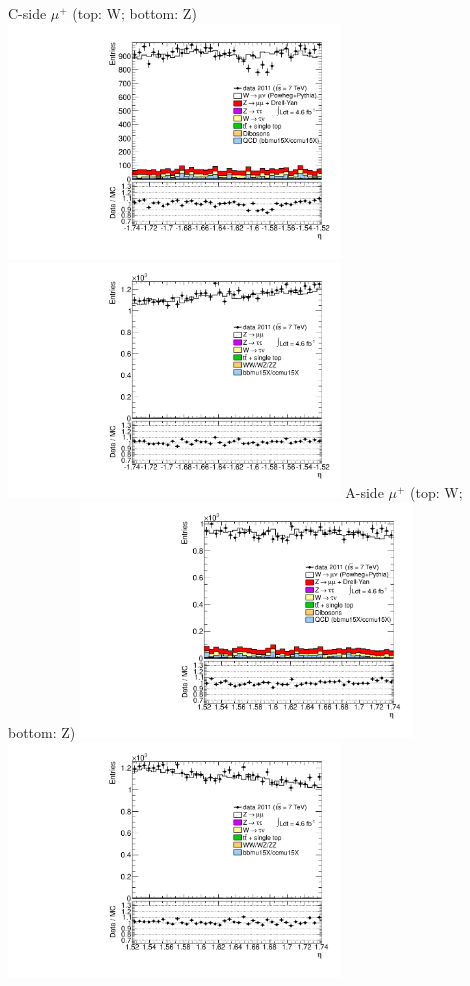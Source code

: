  {
\colb[T]
C-side $\mu^{+}$ (top: W; bottom: Z)
\centering
\includegraphics[width=0.66\textwidth]{dates/20130306/figures/etaphi/WpItoI_8_C_stack_l_eta_POS} \\
\includegraphics[width=0.66\textwidth]{dates/20130306/figures/etaphi/Z_8_C_stack_lP_eta_ALL.pdf}
A-side $\mu^{+}$ (top: W; bottom: Z)
\centering
\includegraphics[width=0.66\textwidth]{dates/20130306/figures/etaphi/WpItoI_8_A_stack_l_eta_POS} \\
\includegraphics[width=0.66\textwidth]{dates/20130306/figures/etaphi/Z_8_A_stack_lP_eta_ALL.pdf} 
\cole
}


